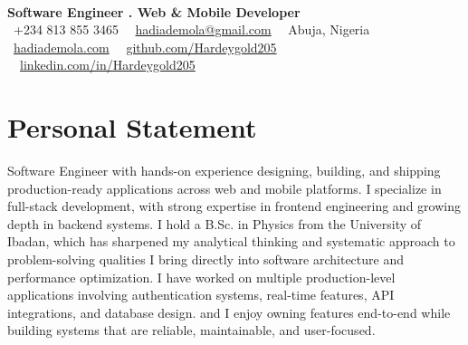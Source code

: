 \documentclass{article}
\newcommand{\resumename}[1]{{\textls[150]{\fontsize{40pt}{40pt}\selectfont\textbf{#1}}}}
\newcommand{\jobtitle}[1]{{\fontsize{15.5pt}{15pt}\selectfont\textbf{#1}}}
\newcommand{\contactinfo}[1]{{\fontsize{12pt}{14pt}\selectfont\color{black!70}#1}}
\begin{document}
\begin{center}
    \resumename{Hadi Ademola S.} \\[0.5cm]
    \jobtitle{Software Engineer . Web \& Mobile Developer} \\[0.2cm]
    \contactinfo{
        \faPhone* \ +234 813 855 3465 \textbar\ 
        \faEnvelope \ \href{mailto:hadiademola@gmail.com}{hadiademola@gmail.com} \textbar\ 
        \faMapMarker* \ Abuja, Nigeria
    } \\[0.3cm]
    \contactinfo{
        \faGlobe \ \href{https://hadiademola.vercel.app}{hadiademola.com} \textbar\
        \faGithub \ \href{https://github.com/Hardeygold205}{github.com/Hardeygold205} \textbar\ 
        \faLinkedin \ \href{https://linkedin.com/in/Hardeygold205}{linkedin.com/in/Hardeygold205}
    }
\end{center}

\vspace{0.1cm}

\section{Personal Statement}
Software Engineer with hands-on experience designing, building, and shipping production-ready applications across web and mobile platforms. I specialize in full-stack development, with strong expertise in frontend engineering and growing depth in backend systems. I hold a B.Sc. in Physics from the University of Ibadan, which has sharpened my analytical thinking and systematic approach to problem-solving qualities I bring directly into software architecture and performance optimization. I have worked on multiple production-level applications involving authentication systems, real-time features, API integrations, and database design. and I enjoy owning features end-to-end while building systems that are reliable, maintainable, and user-focused.
\end{document}
